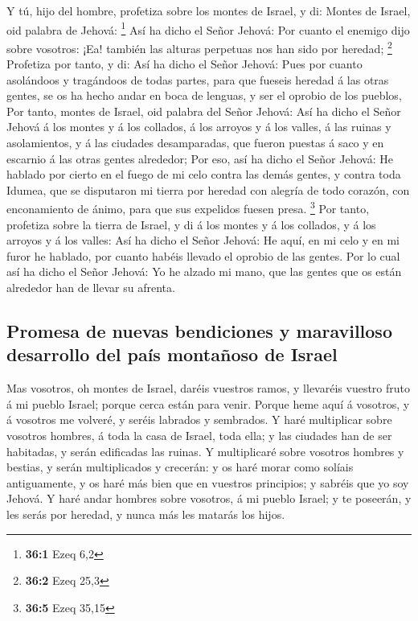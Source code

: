  Y tú, hijo del hombre, profetiza sobre los montes de
Israel, y di: Montes de Israel, oid palabra de Jehová: \footnote{\textbf{36:1}
  Ezeq 6,2}  Así ha dicho el Señor Jehová: Por cuanto el
enemigo dijo sobre vosotros: ¡Ea! también las alturas perpetuas nos han
sido por heredad; \footnote{\textbf{36:2} Ezeq 25,3} 
Profetiza por tanto, y di: Así ha dicho el Señor Jehová: Pues por cuanto
asolándoos y tragándoos de todas partes, para que fueseis heredad á las
otras gentes, se os ha hecho andar en boca de lenguas, y ser el oprobio
de los pueblos,  Por tanto, montes de Israel, oid palabra
del Señor Jehová: Así ha dicho el Señor Jehová á los montes y á los
collados, á los arroyos y á los valles, á las ruinas y asolamientos, y á
las ciudades desamparadas, que fueron puestas á saco y en escarnio á las
otras gentes alrededor;  Por eso, así ha dicho el Señor
Jehová: He hablado por cierto en el fuego de mi celo contra las demás
gentes, y contra toda Idumea, que se disputaron mi tierra por heredad
con alegría de todo corazón, con enconamiento de ánimo, para que sus
expelidos fuesen presa. \footnote{\textbf{36:5} Ezeq 35,15} 
Por tanto, profetiza sobre la tierra de Israel, y di á los montes y á
los collados, y á los arroyos y á los valles: Así ha dicho el Señor
Jehová: He aquí, en mi celo y en mi furor he hablado, por cuanto habéis
llevado el oprobio de las gentes.  Por lo cual así ha dicho
el Señor Jehová: Yo he alzado mi mano, que las gentes que os están
alrededor han de llevar su afrenta.

\hypertarget{promesa-de-nuevas-bendiciones-y-maravilloso-desarrollo-del-pauxeds-montauxf1oso-de-israel}{%
\subsection{Promesa de nuevas bendiciones y maravilloso desarrollo del
país montañoso de
Israel}\label{promesa-de-nuevas-bendiciones-y-maravilloso-desarrollo-del-pauxeds-montauxf1oso-de-israel}}

 Mas vosotros, oh montes de Israel, daréis vuestros ramos, y
llevaréis vuestro fruto á mi pueblo Israel; porque cerca están para
venir.  Porque heme aquí á vosotros, y á vosotros me
volveré, y seréis labrados y sembrados.  Y haré multiplicar
sobre vosotros hombres, á toda la casa de Israel, toda ella; y las
ciudades han de ser habitadas, y serán edificadas las ruinas.
 Y multiplicaré sobre vosotros hombres y bestias, y serán
multiplicados y crecerán: y os haré morar como solíais antiguamente, y
os haré más bien que en vuestros principios; y sabréis que yo soy
Jehová.  Y haré andar hombres sobre vosotros, á mi pueblo
Israel; y te poseerán, y les serás por heredad, y nunca más les matarás
los hijos.

